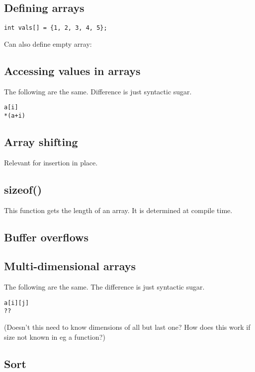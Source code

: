 

\subsection{Defining arrays}

\begin{verbatim}
int vals[] = {1, 2, 3, 4, 5};
\end{verbatim}

Can also define empty array:

\subsection{Accessing values in arrays}

The following are the same. Difference is just syntactic sugar.

\begin{verbatim}
a[i]
*(a+i)
\end{verbatim}

\subsection{Array shifting}

Relevant for insertion in place.

\subsection{sizeof()}

This function gets the length of an array. It is determined at compile time.

\subsection{Buffer overflows}


\subsection{Multi-dimensional arrays}

The following are the same. The difference is just syntactic sugar.

\begin{verbatim}
a[i][j]
??
\end{verbatim}

(Doesn't this need to know dimensions of all but last one? How does this work if size not known in eg a function?)

\subsection{Sort}

